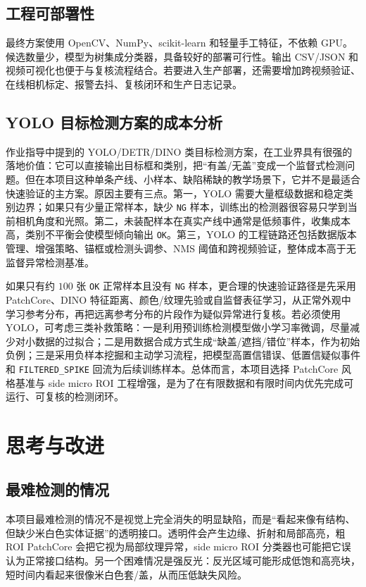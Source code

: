 \documentclass[a4paper,12pt]{article}
\newcommand{\code}[1]{\texttt{#1}}
\begin{document}
\subsection{工程可部署性}
最终方案使用 OpenCV、NumPy、scikit-learn 和轻量手工特征，不依赖 GPU。候选数量少，模型为树集成分类器，具备较好的部署可行性。输出 CSV/JSON 和视频可视化也便于与复核流程结合。若要进入生产部署，还需要增加跨视频验证、在线相机标定、报警去抖、复核闭环和生产日志记录。

\subsection{YOLO 目标检测方案的成本分析}
作业指导中提到的 YOLO/DETR/DINO 类目标检测方案，在工业界具有很强的落地价值：它可以直接输出目标框和类别，把“有盖/无盖”变成一个监督式检测问题。但在本项目这种单条产线、小样本、缺陷稀缺的教学场景下，它并不是最适合快速验证的主方案。原因主要有三点。第一，YOLO 需要大量框级数据和稳定类别边界；如果只有少量正常样本，缺少 \code{NG} 样本，训练出的检测器很容易只学到当前相机角度和光照。第二，未装配样本在真实产线中通常是低频事件，收集成本高，类别不平衡会使模型倾向输出 \code{OK}。第三，YOLO 的工程链路还包括数据版本管理、增强策略、锚框或检测头调参、NMS 阈值和跨视频验证，整体成本高于无监督异常检测基准。

如果只有约 $100$ 张 \code{OK} 正常样本且没有 \code{NG} 样本，更合理的快速验证路径是先采用 PatchCore、DINO 特征距离、颜色/纹理先验或自监督表征学习，从正常外观中学习参考分布，再把远离参考分布的片段作为疑似异常进行复核。若必须使用 YOLO，可考虑三类补救策略：一是利用预训练检测模型做小学习率微调，尽量减少对小数据的过拟合；二是用数据合成方式生成“缺盖/遮挡/错位”样本，作为初始负例；三是采用负样本挖掘和主动学习流程，把模型高置信错误、低置信疑似事件和 \code{FILTERED\_SPIKE} 回流为后续训练样本。总体而言，本项目选择 PatchCore 风格基准与 side micro ROI 工程增强，是为了在有限数据和有限时间内优先完成可运行、可复核的检测闭环。

\section{思考与改进}
\subsection{最难检测的情况}
本项目最难检测的情况不是视觉上完全消失的明显缺陷，而是“看起来像有结构、但缺少米白色实体证据”的透明接口。透明件会产生边缘、折射和局部高亮，粗 ROI PatchCore 会把它视为局部纹理异常，side micro ROI 分类器也可能把它误认为正常接口结构。另一个困难情况是强反光：反光区域可能形成低饱和高亮块，短时间内看起来很像米白色套/盖，从而压低缺失风险。
\end{document}
